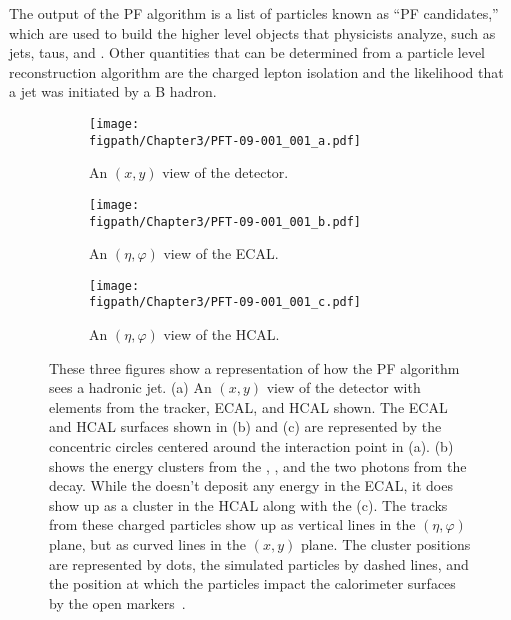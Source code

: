 The output of the PF algorithm is a list of particles known as ``PF candidates,'' which are used to build the higher level objects that physicists analyze, such as jets, taus, and \ETmiss. Other quantities that can be determined from a particle level reconstruction algorithm are the charged lepton isolation and the likelihood that a jet was initiated by a B hadron.





\begin{figure}[!hbt]
	\centering
	\begin{subfigure}[t]{0.53\textwidth}
		\texttt{[image: \\figpath/Chapter3/PFT-09-001\_001\_a.pdf]}
		\caption{An $(x,y)$ view of the detector.}
		\label{fig:PF_linking_a}
	\end{subfigure}

	\begin{subfigure}[t]{0.4655\textwidth}
		\texttt{[image: \\figpath/Chapter3/PFT-09-001\_001\_b.pdf]}
		\caption{An $(\eta,\varphi)$ view of the ECAL.}
		\label{fig:PF_linking_b}
	\end{subfigure}
	\begin{subfigure}[t]{0.4655\textwidth}
		\texttt{[image: \\figpath/Chapter3/PFT-09-001\_001\_c.pdf]}
		\caption{An $(\eta,\varphi)$ view of the HCAL.}
		\label{fig:PF_linking_c}
	\end{subfigure}
	\caption{These three figures show a representation of how the PF algorithm sees a hadronic jet. (a) An $(x,y)$ view of the detector with elements from the tracker, ECAL, and HCAL shown. The ECAL and HCAL surfaces shown in (b) and (c) are represented by the concentric circles centered around the interaction point in (a). (b) shows the energy clusters from the \PKzL, \Pgpm, and the two photons from the \Pgpz decay. While the \Pgpp doesn't deposit any energy in the ECAL, it does show up as a cluster in the HCAL along with the \Pgpm (c). The tracks from these charged particles show up as vertical lines in the $(\eta,\varphi)$ plane, but as curved lines in the $(x,y)$ plane. The cluster positions are represented by dots, the simulated particles by dashed lines, and the position at which the particles impact the calorimeter surfaces by the open markers~\cite{CMS-PAS-PFT-09-001}.}
\end{figure}

\clearpage











